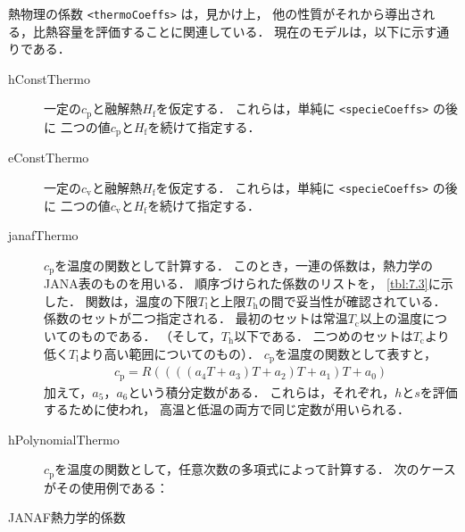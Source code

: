 熱物理の係数 \verb|<thermoCoeffs>| は，見かけ上，
他の性質がそれから導出される，比熱容量を評価することに関連している．
現在のモデルは，以下に示す通りである．
\begin{description}
 \item[hConstThermo]
            一定の$c_{\mathrm{p}}$と融解熱$H_{\mathrm{f}}$を仮定する．
            これらは，単純に \verb|<specieCoeffs>| の後に
            二つの値$c_{\mathrm{p}}$と$H_{\mathrm{f}}$を続けて指定する．
 \item[eConstThermo]
            一定の$c_{\mathrm{v}}$と融解熱$H_{\mathrm{f}}$を仮定する．
            これらは，単純に \verb|<specieCoeffs>| の後に
            二つの値$c_{\mathrm{v}}$と$H_{\mathrm{f}}$を続けて指定する．
 \item[janafThermo]
            $c_{\mathrm{p}}$を温度の関数として計算する．
            このとき，一連の係数は，熱力学のJANA表のものを用いる．
            順序づけられた係数のリストを，
            \autoref{tbl:7.3}に示した．
            関数は，温度の下限$T_{\mathrm{l}}$と上限$T_{\mathrm{h}}$の間で妥当性が確認されている．
            係数のセットが二つ指定される．
            最初のセットは常温$T_{\mathrm{c}}$以上の温度についてのものである．
            （そして，$T_{\mathrm{h}}$以下である．
            二つめのセットは$T_{\mathrm{c}}$より低く$T_{\mathrm{l}}$より高い範囲についてのもの）．
            $c_{\mathrm{p}}$を温度の関数として表すと，
\begin{align}
 \label{eq:7.1}
 c_{\mathrm{p}} = R((((a_{4}T + a_{3})T + a_{2})T + a_{1})T + a_{0})
\end{align}
            加えて，$a_{5}$，$a_{6}$という積分定数がある．
            これらは，それぞれ，$h$と$s$を評価するために使われ，
            高温と低温の両方で同じ定数が用いられる．
 \item[hPolynomialThermo]
            $c_{\mathrm{p}}$を温度の関数として，任意次数の多項式によって計算する．
            次のケースがその使用例である：\\
            \hfil{}
\end{description}


\begin{table}[ht]
 
 \caption{JANAF熱力学的係数}
 \label{tbl:7.3}
\end{table}


